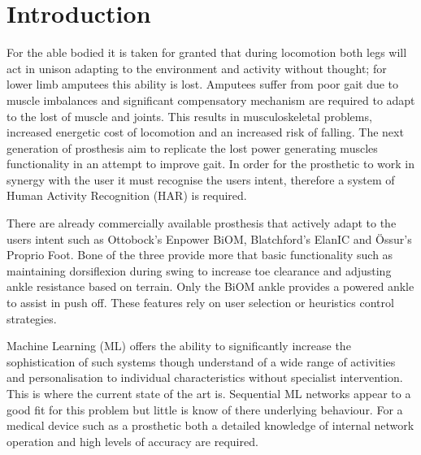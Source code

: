 \documentclass[sensors,article,submit,moreauthors,pdftex]{Definitions/mdpi}
\begin{document}

\section{Introduction}
For the able bodied it is taken for granted that during locomotion both legs will act in unison adapting to the environment and activity without thought; for lower limb amputees this ability is lost. Amputees suffer from poor gait due to muscle imbalances and significant compensatory mechanism are required to adapt to the lost of muscle and joints\cite{Silverman2008}. This results in musculoskeletal problems, increased energetic cost of locomotion and an increased risk of falling\cite{Herr2012, Piazza2017, McDonald2018}. The next generation of prosthesis aim to replicate the lost power generating muscles functionality in an attempt to improve gait. In order for the prosthetic to work in synergy with the user it must recognise the users intent, therefore a system of Human Activity Recognition (HAR) is required.

There are already commercially available prosthesis that actively adapt to the users intent such as Ottobock's Enpower BiOM\cite{Enpower}, Blatchford's ElanIC\cite{ElanIC} and \"Ossur's Proprio Foot\cite{Proprio}. Bone of the three provide more that basic functionality such as maintaining dorsiflexion during swing to increase toe clearance and adjusting ankle resistance based on terrain. Only the BiOM ankle provides a powered ankle to assist in push off. These features rely on user selection or heuristics control strategies.

Machine Learning (ML) offers the ability to significantly increase the sophistication of such systems though understand of a wide range of activities and personalisation to individual characteristics without specialist intervention\cite{Labarriere2020}. This is where the current state of the art is. Sequential ML networks appear to a good fit for this problem but little is know of there underlying behaviour. For a medical device such as a prosthetic both a detailed knowledge of internal network operation and high levels of accuracy are required. 
\end{document}
